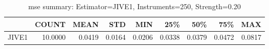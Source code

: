 \begin{table}[ht]
\centering
\caption{mse summary: Estimator=JIVE1, Instruments=250, Strength=0.20}
\begin{tabular}{lrrrrrrrr}
\toprule
 & COUNT & MEAN & STD & MIN & 25\% & 50\% & 75\% & MAX \\
\midrule
JIVE1 & 10.0000 & 0.0419 & 0.0164 & 0.0206 & 0.0338 & 0.0379 & 0.0472 & 0.0817 \\
\bottomrule
\end{tabular}
\end{table}
